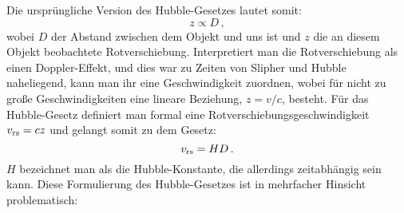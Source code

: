 Die urspr\"ungliche Version des Hubble-Gesetzes lautet somit:
\begin{equation}
\label{eq_zHubble}
                  z \propto D \, ,
\end{equation}
wobei $D$ der Abstand zwischen dem Objekt und uns ist und $z$ die an diesem Objekt
beobachtete Rotverschiebung. Interpretiert man die Rotverschiebung als einen Doppler-Effekt,
und dies war zu Zeiten von Slipher und Hubble naheliegend,
kann man ihr eine Geschwindigkeit zuordnen, wobei f\"ur nicht zu gro\ss e Geschwindigkeiten
eine lineare Beziehung, $z= v/c$, besteht. F\"ur das Hubble-Gesetz definiert man formal eine
Rotverschiebungsgeschwindigkeit $v_{\rm rs}= c z$ und gelangt somit zu dem Gesetz:
\begin{equation}
                  v_{\rm rs} = H  D \, .
\end{equation}
$H$ bezeichnet man als die Hubble-Konstante, die allerdings zeitabh\"angig sein kann. 
Diese Formulierung des Hubble-Gesetzes ist
in mehrfacher Hinsicht problematisch: 
